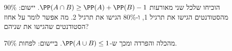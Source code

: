 הוכיחו שלכל שני מאורעות $\PP(A\cap B)\ge\PP(A)+\PP(B)-1$.
יישום: 90\% מהסטודנטים הגישו את תרגיל 1, ו-80\% הגישו את תרגיל 2. מה אפשר לומר על אחוז הסטודנטים שהגישו את שניהם?
\begin{solbox}
מהכלה והפרדה ומכך ש-$\PP(A\cup B)\le1$. ביישום: לפחות 70\%.
\end{solbox}
